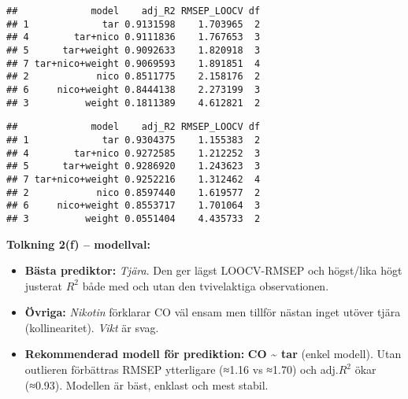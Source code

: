 \documentclass[
  11pt,
]{article}
\newenvironment{Shaded}{\begin{snugshade}}{\end{snugshade}}
\newcommand{\FunctionTok}[1]{\textcolor[rgb]{0.13,0.29,0.53}{\textbf{#1}}}
\newcommand{\NormalTok}[1]{#1}
\newcommand{\SpecialCharTok}[1]{\textcolor[rgb]{0.81,0.36,0.00}{\textbf{#1}}}
\providecommand{\tightlist}{%
  \setlength{\itemsep}{0pt}\setlength{\parskip}{0pt}}
\begin{document}
\begin{verbatim}
##             model    adj_R2 RMSEP_LOOCV df
## 1             tar 0.9131598    1.703965  2
## 4        tar+nico 0.9111836    1.767653  3
## 5      tar+weight 0.9092633    1.820918  3
## 7 tar+nico+weight 0.9069593    1.891851  4
## 2            nico 0.8511775    2.158176  2
## 6     nico+weight 0.8444138    2.273199  3
## 3          weight 0.1811389    4.612821  2
\end{verbatim}

\begin{Shaded}
\end{Shaded}

\begin{verbatim}
##             model    adj_R2 RMSEP_LOOCV df
## 1             tar 0.9304375    1.155383  2
## 4        tar+nico 0.9272585    1.212252  3
## 5      tar+weight 0.9286920    1.243623  3
## 7 tar+nico+weight 0.9252216    1.312462  4
## 2            nico 0.8597440    1.619577  2
## 6     nico+weight 0.8553717    1.701064  3
## 3          weight 0.0551404    4.435733  2
\end{verbatim}

\textbf{Tolkning 2(f) -- modellval:}

\begin{itemize}
\tightlist
\item
  \textbf{Bästa prediktor:} \emph{Tjära}. Den ger lägst LOOCV-RMSEP och
  högst/lika högt justerat \(R^2\) både med och utan den tvivelaktiga
  observationen.
\item
  \textbf{Övriga:} \emph{Nikotin} förklarar CO väl ensam men tillför
  nästan inget utöver tjära (kollinearitet). \emph{Vikt} är svag.
\item
  \textbf{Rekommenderad modell för prediktion:} \textbf{CO
  \textasciitilde{} tar} (enkel modell). Utan outlieren förbättras RMSEP
  ytterligare (≈1.16 vs ≈1.70) och adj.\(R^2\) ökar (≈0.93). Modellen är
  bäst, enklast och mest stabil.
\end{itemize}
\end{document}
